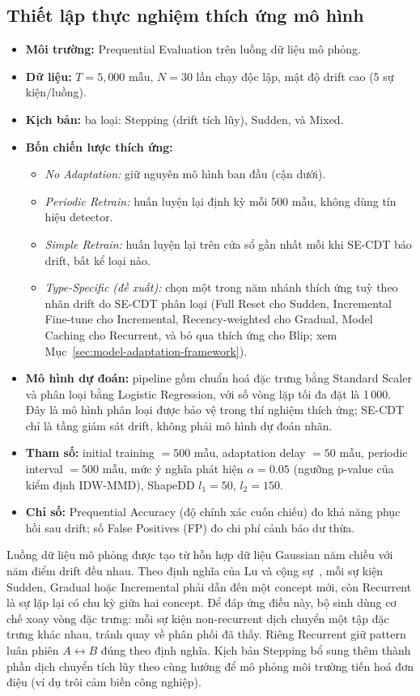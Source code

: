 \subsection{Thiết lập thực nghiệm thích ứng mô hình}
\begin{itemize}
	\item \textbf{Môi trường:} Prequential Evaluation trên luồng dữ liệu mô phỏng.
	\item \textbf{Dữ liệu:} $T = 5{,}000$ mẫu, $N = 30$ lần chạy độc lập, mật độ drift cao (5 sự kiện/luồng).
	\item \textbf{Kịch bản:} ba loại: Stepping (drift tích lũy), Sudden, và Mixed.
	\item \textbf{Bốn chiến lược thích ứng:}
	\begin{itemize}
		\item \textit{No Adaptation:} giữ nguyên mô hình ban đầu (cận dưới).
		\item \textit{Periodic Retrain:} huấn luyện lại định kỳ mỗi 500 mẫu, không dùng tín hiệu detector.
		\item \textit{Simple Retrain:} huấn luyện lại trên cửa sổ gần nhất mỗi khi SE-CDT báo drift, bất kể loại nào.
		\item \textit{Type-Specific (đề xuất):} chọn một trong năm nhánh thích ứng tuỳ theo nhãn drift do SE-CDT phân loại (Full Reset cho Sudden, Incremental Fine-tune cho Incremental, Recency-weighted cho Gradual, Model Caching cho Recurrent, và bỏ qua thích ứng cho Blip; xem Mục~\ref{sec:model-adaptation-framework}).
	\end{itemize}
		\item \textbf{Mô hình dự đoán:} pipeline gồm chuẩn hoá đặc trưng bằng Standard Scaler và phân loại bằng Logistic Regression, với số vòng lặp tối đa đặt là 1\,000. Đây là mô hình phân loại được bảo vệ trong thí nghiệm thích ứng; SE-CDT chỉ là tầng giám sát drift, không phải mô hình dự đoán nhãn.
	\item \textbf{Tham số:} initial training $=500$ mẫu, adaptation delay $=50$ mẫu, periodic interval $=500$ mẫu, mức ý nghĩa phát hiện $\alpha = 0.05$ (ngưỡng p-value của kiểm định IDW-MMD), ShapeDD $l_1 = 50$, $l_2 = 150$.
	\item \textbf{Chỉ số:} Prequential Accuracy (độ chính xác cuốn chiếu) đo khả năng phục hồi sau drift; số False Positives (FP) đo chi phí cảnh báo dư thừa.
\end{itemize}

Luồng dữ liệu mô phỏng được tạo từ hỗn hợp dữ liệu Gaussian năm chiều với năm điểm drift đều nhau. Theo định nghĩa của Lu và cộng sự~\cite{lu2018learning}, mỗi sự kiện Sudden, Gradual hoặc Incremental phải dẫn đến một concept mới, còn Recurrent là sự lặp lại có chu kỳ giữa hai concept. Để đáp ứng điều này, bộ sinh dùng cơ chế xoay vòng đặc trưng: mỗi sự kiện non-recurrent dịch chuyển một tập đặc trưng khác nhau, tránh quay về phân phối đã thấy. Riêng Recurrent giữ pattern luân phiên $A \leftrightarrow B$ đúng theo định nghĩa. Kịch bản Stepping bổ sung thêm thành phần dịch chuyển tích lũy theo cùng hướng để mô phỏng môi trường tiến hoá đơn điệu (ví dụ trôi cảm biến công nghiệp).

